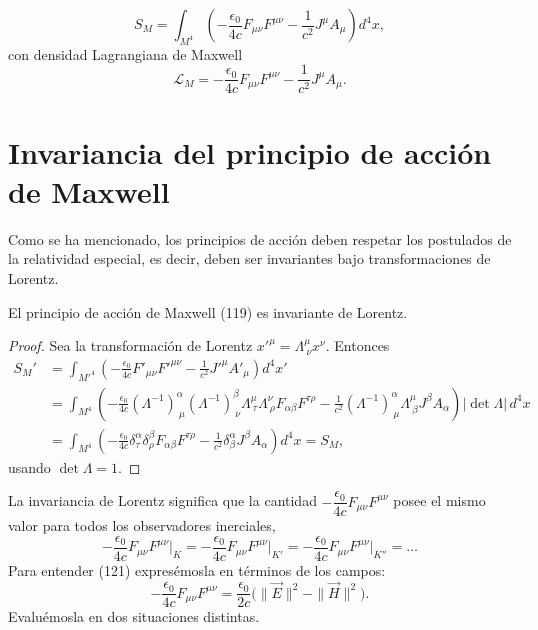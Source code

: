\begin{definicion}
\[
S_M=\int_{M^4}\left(-\frac{\epsilon_0}{4c}F_{\mu\nu}F^{\mu\nu}-\frac{1}
{c^2}J^\mu A_\mu\right)d^4x, \tag{119}
\]
con densidad Lagrangiana de Maxwell
\[
\mathscr{L}_M=-\frac{\epsilon_0}{4c}F_{\mu\nu}F^{\mu\nu}-\frac{1}{c^2}
J^\mu A_\mu . \tag{120}
\]
\end{definicion}

\section{Invariancia del principio de acción de Maxwell}

Como se ha mencionado, los principios de acción deben respetar los
postulados de la relatividad especial, es decir, deben ser invariantes
bajo transformaciones de Lorentz.

\begin{proposicionc}
El principio de acción de Maxwell (119) es invariante de Lorentz.
\end{proposicionc}

\begin{proof}
Sea la transformación de Lorentz $x'^\mu=\Lambda^\mu_{\ \nu}x^\nu$.
Entonces
\[
\begin{aligned}
S_M' &= \int_{M'^4}\left(-\frac{\epsilon_0}{4c}F'_{\mu\nu}F'^{\mu\nu}-
\frac{1}{c^2}J'^\mu A'_\mu\right)d^4x'\\
&= \int_{M^4}\left(-\frac{\epsilon_0}{4c}(\Lambda^{-1})^\alpha_{\ \mu}
(\Lambda^{-1})^\beta_{\ \nu}\Lambda^\mu_{\ \tau}\Lambda^\nu_{\ \rho}
F_{\alpha\beta}F^{\tau\rho}-\frac{1}{c^2}(\Lambda^{-1})^\alpha_{\ \mu}
\Lambda^\mu_{\ \beta}J^\beta A_\alpha\right)|\det\Lambda|\,d^4x\\
&= \int_{M^4}\left(-\frac{\epsilon_0}{4c}\delta^\alpha_\tau\delta^\beta_
\rho F_{\alpha\beta}F^{\tau\rho}-\frac{1}{c^2}\delta^\alpha_\beta J^\beta
A_\alpha\right)d^4x = S_M,
\end{aligned}
\]
usando $\det\Lambda=1$. \qedhere
\end{proof}

La invariancia de Lorentz significa que la cantidad $-\dfrac{\epsilon_0}
{4c}F_{\mu\nu}F^{\mu\nu}$ posee el mismo valor para todos los observadores
inerciales,
\[
-\frac{\epsilon_0}{4c}F_{\mu\nu}F^{\mu\nu}\Big|_K=-\frac{\epsilon_0}{4c}
F_{\mu\nu}F^{\mu\nu}\Big|_{K'}=-\frac{\epsilon_0}{4c}F_{\mu\nu}F^{\mu\nu}
\Big|_{K''}=\dots \tag{121}
\]
Para entender (121) expresémosla en términos de los campos:
\[
-\frac{\epsilon_0}{4c}F_{\mu\nu}F^{\mu\nu}=\frac{\epsilon_0}{2c}\Big(
\|\vec E\|^2-\|\vec H\|^2\Big). \tag{122}
\]
Evaluémosla en dos situaciones distintas.

